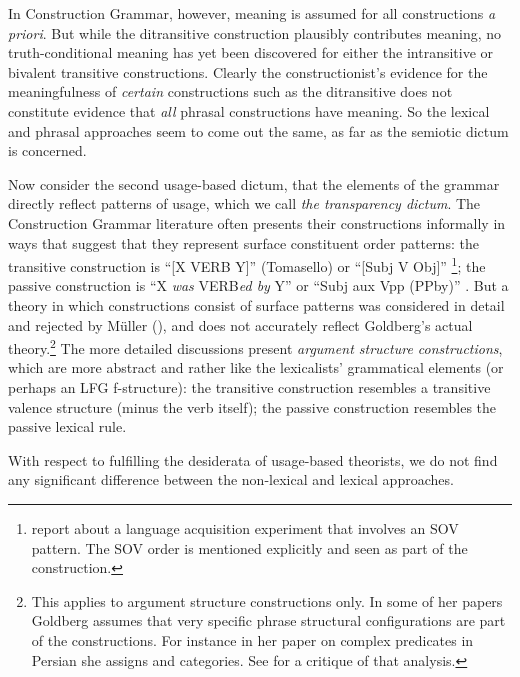 In Construction Grammar, however, meaning is assumed for all constructions  \emph{a priori}.  But
while the ditransitive construction plausibly contributes meaning, no truth-conditional meaning has
yet been discovered for either the intransitive or bivalent transitive constructions.  Clearly the
constructionist's evidence for the meaningfulness of \emph{certain} constructions such as the
ditransitive does not constitute evidence that \emph{all} phrasal constructions have meaning.  So
the lexical and phrasal approaches seem to come out the same, as far as the semiotic dictum is
concerned.


Now consider the second usage-based dictum, that the elements of the grammar directly reflect
patterns of usage, which we call \emph{the transparency dictum}.  The Construction Grammar
literature often presents their constructions informally in ways that suggest that they represent
surface constituent order patterns: the transitive construction is ``[X VERB Y]'' (Tomasello) or ``[Subj V Obj]''
\citep{Goldberg95a,Goldberg2006a}\footnote{
  \citet[]{GCS2004a} report about a language acquisition experiment that involves an SOV
  pattern. The SOV order is mentioned explicitly and seen as part of the construction.
}; the passive construction is ``X \emph{was} VERB\emph{ed by} Y''
\citep[]{Tomasello2003a} or ``Subj aux Vpp (PPby)'' \citep[]{Goldberg2006a}.  But a theory
in which constructions consist of surface patterns was considered in detail and rejected by
Müller (\citeyear[Section~2]{Mueller2006d}), and does not accurately reflect Goldberg's actual
theory.\footnote{
  This applies to argument structure constructions only. In some of her papers Goldberg assumes that
  very specific phrase structural configurations are part of the constructions. For instance in her
  paper on complex predicates in Persian \citep{Goldberg2003a} she assigns \vnull and \vbar categories. See
   for a critique of that analysis.} 
The more detailed discussions present \emph{argument structure
  constructions}, which are more abstract and rather like the lexicalists' grammatical elements (or
perhaps an LFG f-structure): the transitive construction resembles a transitive valence structure
(minus the verb itself); the passive construction resembles the passive lexical rule.

With respect to fulfilling the desiderata of usage-based theorists, we do not find 
any significant difference between the
non-lexical and lexical approaches.  

